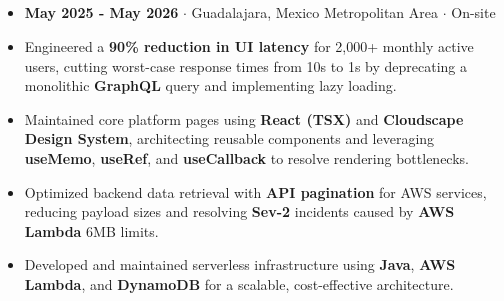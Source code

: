 \documentclass[11pt]{article}
\begin{document}
\subsection*{\href{https://www.linkedin.com/posts/erick-alejandro-carrillo-lopez-988112219_insideamazon-activity-7327859924430983168-9fea/?utm_source=social_share_send&utm_medium=member_desktop_web&rcm=ACoAADcC__gBemOCV1NOvi7df8iURkjzHMcGapo}{\color{blue}{Software Development Engineer Intern - Amazon}}}
\vspace{-0.3cm}
\begin{itemize}[noitemsep, nolistsep]
\item \textbf{May 2025 - May 2026} $\cdot$ Guadalajara, Mexico Metropolitan Area $\cdot$ On-site
\item Engineered a \textbf{90\% reduction in UI latency} for 2,000+ monthly active users, cutting worst-case response times from 10s to 1s by deprecating a monolithic \textbf{GraphQL} query and implementing lazy loading.
\item Maintained core platform pages using \textbf{React (TSX)} and \textbf{Cloudscape Design System}, architecting reusable components and leveraging \textbf{useMemo}, \textbf{useRef}, and \textbf{useCallback} to resolve rendering bottlenecks.
\item Optimized backend data retrieval with \textbf{API pagination} for AWS services, reducing payload sizes and resolving \textbf{Sev-2} incidents caused by \textbf{AWS Lambda} 6MB limits.
\item Developed and maintained serverless infrastructure using \textbf{Java}, \textbf{AWS Lambda}, and \textbf{DynamoDB} for a scalable, cost-effective architecture.
\end{itemize}
\vspace{-0.4cm}

\subsection*{\href{https://www.linkedin.com/feed/update/urn:li:activity:7225289702315073536/}{\color{blue}{SW Test Engineer Intern - Toshiba Global Commerce Solutions}}}
\vspace{-0.3cm}
\end{document}

